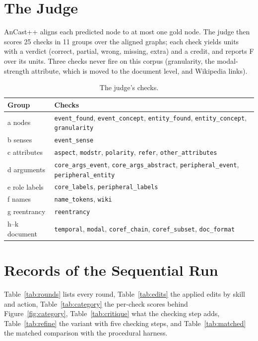 \section{The Judge}
\label{app:judge}

AnCast++ aligns each predicted node to at most one gold node. The judge then scores 25 checks in 11 groups over the aligned graphs; each check yields units with a verdict (correct, partial, wrong, missing, extra) and a credit, and reports F over its units. Three checks never fire on this corpus (granularity, the modal-strength attribute, which is moved to the document level, and Wikipedia links).

\begin{table}[h]
\centering\scriptsize
\setlength{\tabcolsep}{3pt}
\begin{tabular}{@{}lp{}@{}}
\toprule
Group & Checks \\
\midrule
a nodes & \texttt{event\_found}, \texttt{event\_concept}, \texttt{entity\_found}, \texttt{entity\_concept}, \texttt{granularity} \\
b senses & \texttt{event\_sense} \\
c attributes & \texttt{aspect}, \texttt{modstr}, \texttt{polarity}, \texttt{refer}, \texttt{other\_attributes} \\
d arguments & \texttt{core\_args\_event}, \texttt{core\_args\_abstract}, \texttt{peripheral\_event}, \texttt{peripheral\_entity} \\
e role labels & \texttt{core\_labels}, \texttt{peripheral\_labels} \\
f names & \texttt{name\_tokens}, \texttt{wiki} \\
g reentrancy & \texttt{reentrancy} \\
h--k document & \texttt{temporal}, \texttt{modal}, \texttt{coref\_chain}, \texttt{coref\_subset}, \texttt{doc\_format} \\
\bottomrule
\end{tabular}
\caption{The judge's checks.}
\label{tab:judge}
\end{table}

\section{Records of the Sequential Run}
\label{app:records}

Table~\ref{tab:rounds} lists every round, Table~\ref{tab:edits} the applied edits by skill and action, Table~\ref{tab:category} the per-check scores behind Figure~\ref{fig:category}, Table~\ref{tab:critique} what the checking step adds, Table~\ref{tab:refine} the variant with five checking steps, and Table~\ref{tab:matched} the matched comparison with the procedural harness.

